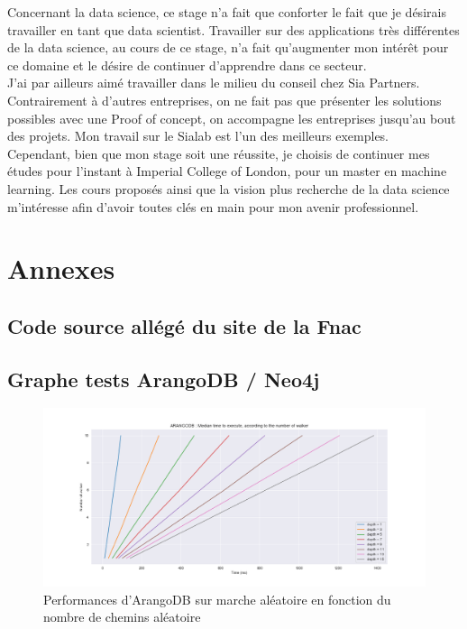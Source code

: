 \documentclass{article} %
\begin{document}
{Concernant la data science, ce stage n’a fait que conforter le fait que je
désirais travailler en tant que data scientist. Travailler sur des applications très
différentes de la data science, au cours de ce stage, n’a fait qu’augmenter mon intérêt
pour ce domaine et le désire de continuer d’apprendre dans ce secteur.\\

J'ai par ailleurs aimé travailler dans le milieu du conseil chez Sia Partners. Contrairement à d'autres entreprises, on ne fait pas que présenter les solutions possibles avec une Proof of concept, on accompagne les entreprises jusqu'au bout des projets. Mon travail sur le Sialab est l'un des meilleurs exemples.\\

Cependant, bien que mon stage soit une réussite, je choisis de continuer mes études pour l'instant à Imperial College of London, pour un master en machine learning. Les cours proposés ainsi que la vision plus recherche de la data science m'intéresse afin d'avoir toutes clés en main pour mon avenir professionnel.


\newpage

\section{Annexes}
\subsection{Code source allégé du site de la Fnac}
%
\newpage
\subsection{Graphe tests ArangoDB / Neo4j}

\begin{figure}[!h]
 \centering
 \includegraphics[keepaspectratio = true,scale=0.4]{arangoDB_nbwalker_time.png}
 \caption{Performances d'ArangoDB sur marche aléatoire en fonction du nombre de chemins aléatoire}
 \label{fig:arwalk}
\end{figure}


}
\end{document}
